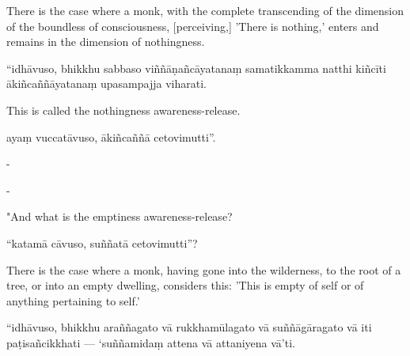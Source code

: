 \begin{samepage}
\begin{leftcolumn*}
There is the case where a monk, with the complete transcending of the dimension of the boundless of consciousness, [perceiving,] 'There is nothing,' enters and remains in the dimension of nothingness.
\end{leftcolumn*}

\begin{rightcolumn}
“idhāvuso, bhikkhu sabbaso viññāṇañcāyatanaṃ samatikkamma natthi kiñcīti ākiñcaññāyatanaṃ upasampajja viharati.
\end{rightcolumn}
\end{samepage}

\begin{samepage}
\begin{leftcolumn*}
This is called the nothingness awareness-release.
\end{leftcolumn*}

\begin{rightcolumn}
ayaṃ vuccatāvuso, ākiñcaññā cetovimutti”.
\end{rightcolumn}
\end{samepage}

\begin{samepage}
\begin{leftcolumn*}
-
\end{leftcolumn*}

\begin{rightcolumn}
-
\end{rightcolumn}
\end{samepage}

\begin{samepage}
\begin{leftcolumn*}
"And what is the emptiness awareness-release?
\end{leftcolumn*}

\begin{rightcolumn}
“katamā cāvuso, suññatā cetovimutti”?
\end{rightcolumn}
\end{samepage}

\begin{samepage}
\begin{leftcolumn*}
There is the case where a monk, having gone into the wilderness, to the root of a tree, or into an empty dwelling, considers this: 'This is empty of self or of anything pertaining to self.'
\end{leftcolumn*}

\begin{rightcolumn}
“idhāvuso, bhikkhu araññagato vā rukkhamūlagato vā suññāgāragato vā iti paṭisañcikkhati — ‘suññamidaṃ attena vā attaniyena vā’ti.
\end{rightcolumn}
\end{samepage}

